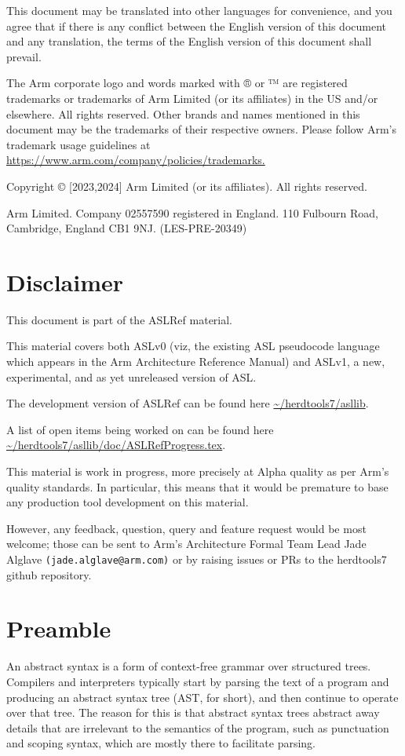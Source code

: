 \documentclass{book}
\begin{document}
This document may be translated into other languages for convenience, and you
agree that if there is any conflict between the English version of this
document and any translation, the terms of the English version of this document
shall prevail.
 
The Arm corporate logo and words marked with ® or ™ are registered trademarks
or trademarks of Arm Limited (or its affiliates) in the US and/or elsewhere.
All rights reserved.  Other brands and names mentioned in this document may be
the trademarks of their respective owners. Please follow Arm’s trademark usage
guidelines at \url{https://www.arm.com/company/policies/trademarks.} 
 
Copyright © [2023,2024] Arm Limited (or its affiliates). All rights reserved. 
 
Arm Limited. Company 02557590 registered in England.  110 Fulbourn Road,
Cambridge, England CB1 9NJ.  (LES-PRE-20349)

\chapter{Disclaimer}

This document is part of the ASLRef material. 

This material covers both ASLv0 (viz, the existing ASL pseudocode language
which appears in the Arm Architecture Reference Manual) and ASLv1, a new,
experimental, and as yet unreleased version of ASL.

The development version of ASLRef can be found here \url{~/herdtools7/asllib}.

A list of open items being worked on can be found here
\url{~/herdtools7/asllib/doc/ASLRefProgress.tex}.

This material is work in progress, more precisely at Alpha quality as
per Arm’s quality standards. In particular, this means that it would be
premature to base any production tool development on this material.

However, any feedback, question, query and feature request would be most
welcome; those can be sent to Arm’s Architecture Formal Team Lead Jade Alglave
\texttt{(jade.alglave@arm.com)} or by raising issues or PRs to the herdtools7
github repository.

\chapter{Preamble}
An abstract syntax is a form of context-free grammar over structured trees. Compilers and interpreters typically start by parsing the text of a program and producing an abstract syntax tree (AST, for short), and then continue to operate over that tree.
%
The reason for this is that abstract syntax trees abstract away details that are irrelevant to the semantics of the program, such as punctuation and scoping syntax, which are mostly there to facilitate parsing.
\end{document}
